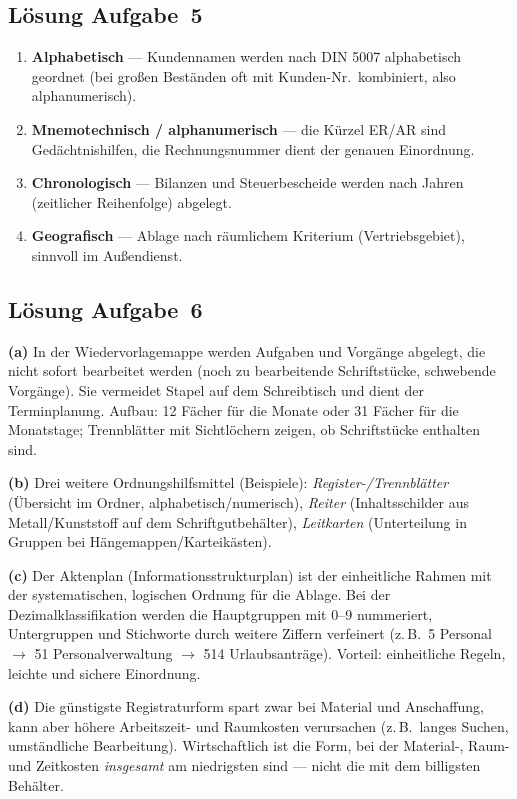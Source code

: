 \documentclass[11pt, a4paper]{article}
\begin{document}
\subsection*{Lösung Aufgabe~5}
\begin{loesung}
\begin{enumerate}[label=\arabic*., itemsep=0pt]
  \item \textbf{Alphabetisch} --- Kundennamen werden nach DIN 5007 alphabetisch geordnet (bei großen Beständen oft mit Kunden-Nr.\ kombiniert, also alphanumerisch).
  \item \textbf{Mnemotechnisch / alphanumerisch} --- die Kürzel ER/AR sind Gedächtnishilfen, die Rechnungsnummer dient der genauen Einordnung.
  \item \textbf{Chronologisch} --- Bilanzen und Steuerbescheide werden nach Jahren (zeitlicher Reihenfolge) abgelegt.
  \item \textbf{Geografisch} --- Ablage nach räumlichem Kriterium (Vertriebsgebiet), sinnvoll im Außendienst.
\end{enumerate}
\end{loesung}

\subsection*{Lösung Aufgabe~6}
\begin{loesung}
\textbf{(a)} In der Wiedervorlagemappe werden Aufgaben und Vorgänge abgelegt, die nicht
sofort bearbeitet werden (noch zu bearbeitende Schriftstücke, schwebende Vorgänge). Sie
vermeidet Stapel auf dem Schreibtisch und dient der Terminplanung. Aufbau: 12 Fächer für
die Monate oder 31 Fächer für die Monatstage; Trennblätter mit Sichtlöchern zeigen, ob
Schriftstücke enthalten sind.

\textbf{(b)} Drei weitere Ordnungshilfsmittel (Beispiele): \emph{Register-/Trennblätter}
(Übersicht im Ordner, alphabetisch/numerisch), \emph{Reiter} (Inhaltsschilder aus
Metall/Kunststoff auf dem Schriftgutbehälter), \emph{Leitkarten} (Unterteilung in Gruppen
bei Hängemappen/Karteikästen).

\textbf{(c)} Der Aktenplan (Informationsstrukturplan) ist der einheitliche Rahmen mit der
systematischen, logischen Ordnung für die Ablage. Bei der Dezimalklassifikation werden die
Hauptgruppen mit 0--9 nummeriert, Untergruppen und Stichworte durch weitere Ziffern
verfeinert (z.\,B.\ 5 Personal $\rightarrow$ 51 Personalverwaltung $\rightarrow$
514 Urlaubsanträge). Vorteil: einheitliche Regeln, leichte und sichere Einordnung.

\textbf{(d)} Die günstigste Registraturform spart zwar bei Material und Anschaffung, kann
aber höhere Arbeitszeit- und Raumkosten verursachen (z.\,B.\ langes Suchen, umständliche
Bearbeitung). Wirtschaftlich ist die Form, bei der Material-, Raum- und Zeitkosten
\emph{insgesamt} am niedrigsten sind --- nicht die mit dem billigsten Behälter.
\end{loesung}
\end{document}
